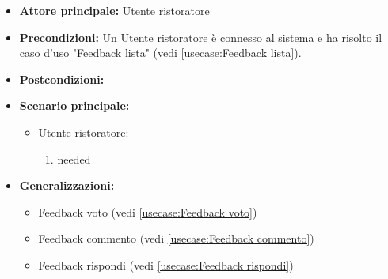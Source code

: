 \label{usecase:Feedback dettaglio}
\begin{itemize}
\item \textbf{Attore principale:} Utente ristoratore
\item \textbf{Precondizioni:}
Un Utente ristoratore è connesso al sistema e ha risolto il caso d'uso "Feedback lista" (vedi \autoref{usecase:Feedback lista}).
\item \textbf{Postcondizioni:}
\item \textbf{Scenario principale:}
\begin{itemize}
\item Utente ristoratore:
\begin{enumerate}
\item needed
\end{enumerate}
\end{itemize}
\item \textbf{Generalizzazioni:}
\begin{itemize}
\item Feedback voto (vedi \autoref{usecase:Feedback voto})\item Feedback commento (vedi \autoref{usecase:Feedback commento})\item Feedback rispondi (vedi \autoref{usecase:Feedback rispondi})
\end{itemize}
\end{itemize}